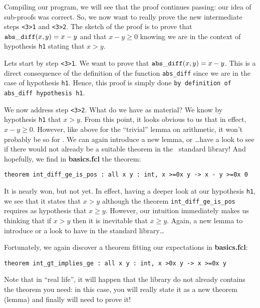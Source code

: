 \documentclass[11pt,a4paper,twoside,onecolumn,fullpage]{article}
\begin{document}
Compiling our program, we will see that the proof continues passing:
our idea of sub-proofs was correct. So, we now want to really prove
the new intermediate steps \lstinline"<3>1" and \lstinline"<3>2". The
sketch of the proof is to prove that ${\tt abs\_diff} (x, y) = x - y$ and
that $x - y \ge 0$ knowing we are in the context of hypothesis
\lstinline"h1" stating that $x > y$.

Lets start by step \lstinline"<3>1". We want to prove that
${\tt abs\_diff} (x, y) = x - y$.
This is a direct consequence of the definition of the function
\lstinline"abs_diff" since we are in the case of hypothesis
\lstinline"h1". Hence, this proof is simply done
\lstinline"by definition of abs_diff hypothesis h1".

We now address step \lstinline"<3>2".  What do we have as material? We
know by hypothesis \lstinline"h1" that $x>y$. From this point, it looks
obvious to us that in effect,  $x - y \ge 0$. However, like above for
the ``trivial'' lemma on arithmetic, it won't probably be so for
\zenon. We can again introduce a new lemma, or \ldots have a look to
see if there would not already be a suitable theorem in the \focal\
standard library! And hopefully, we find in \textbf{basics.fcl} the
theorem:

{\scriptsize
\begin{lstlisting}
theorem int_diff_ge_is_pos : all x y : int, x >=0x y -> x - y >=0x 0
\end{lstlisting}}

It is nearly won, but not yet. In effect, having a deeper look at our
hypothesis \lstinline"h1", we see that it states that $x > y$ although
the theorem \lstinline"int_diff_ge_is_pos" requires as hypothesis that
$x \ge y$. However, our intuition immediately makes us thinking that if
$x > y$ then it is inevitable that $x \ge y$. Again, a new lemma to
introduce or a look to have in the standard library\ldots

Fortunately, we again discover a theorem fitting our expectations in
\textbf{basics.fcl}:

{\scriptsize
\begin{lstlisting}
theorem int_gt_implies_ge : all x y : int, x >0x y -> x >=0x y
\end{lstlisting}}

Note that in ``real life'', it will happen that the library do not already
contains the theorem you need: in this case, you will really state it
as a new theorem (lemma) and finally will need to prove it!
\end{document}
